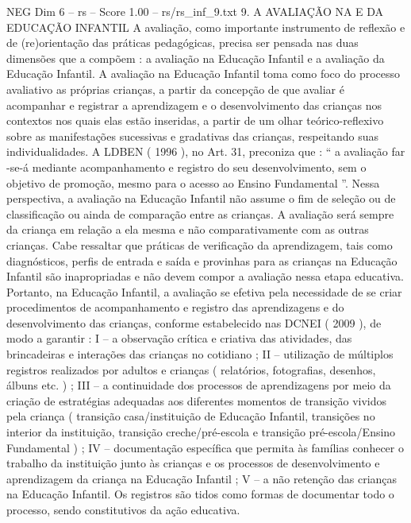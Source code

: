\begin{textsample}{NEG Dim 6 – rs – Score 1.00 – rs/rs\_inf\_9.txt}  \label{ex:f6_neg_101}
9.
A AVALIAÇÃO NA E DA EDUCAÇÃO INFANTIL A avaliação, como importante instrumento de reflexão e de (re)orientação das práticas pedagógicas, precisa ser pensada nas duas dimensões que a compõem : a avaliação na Educação Infantil e a avaliação da Educação Infantil.
A avaliação na Educação Infantil toma como foco do processo avaliativo as próprias crianças, a partir da concepção de que avaliar é acompanhar e registrar a aprendizagem e o desenvolvimento das crianças nos contextos nos quais elas estão inseridas, a partir de um olhar teórico-reflexivo sobre as manifestações sucessivas e gradativas das crianças, respeitando suas individualidades.
A LDBEN ( 1996 ), no Art. 31, preconiza que : “ a avaliação far -se-á mediante acompanhamento e registro do seu desenvolvimento, sem o objetivo de promoção, mesmo para o acesso ao Ensino Fundamental ”.
Nessa perspectiva, a avaliação na Educação Infantil não assume o fim de seleção ou de classificação ou ainda de comparação entre as crianças.
A avaliação será sempre da criança em relação a ela mesma e não comparativamente com as outras crianças.
Cabe ressaltar que práticas de verificação da aprendizagem, tais como diagnósticos, perfis de entrada e saída e provinhas para as crianças na Educação Infantil são inapropriadas e não devem compor a avaliação nessa etapa educativa.
Portanto, na Educação Infantil, a avaliação se efetiva pela necessidade de se criar procedimentos de acompanhamento e registro das aprendizagens e do desenvolvimento das crianças, conforme estabelecido nas DCNEI ( 2009 ), de modo a garantir : I – a observação crítica e criativa das atividades, das brincadeiras e interações das crianças no cotidiano ; II – utilização de múltiplos registros realizados por adultos e crianças ( relatórios, fotografias, desenhos, álbuns etc. ) ; III – a continuidade dos processos de aprendizagens por meio da criação de estratégias adequadas aos diferentes momentos de transição vividos pela criança ( transição casa/instituição de Educação Infantil, transições no interior da instituição, transição creche/pré-escola e transição pré-escola/Ensino Fundamental ) ; IV – documentação específica que permita às famílias conhecer o trabalho da instituição junto às crianças e os processos de desenvolvimento e aprendizagem da criança na Educação Infantil ; V – a não retenção das crianças na Educação Infantil.
Os registros são tidos como formas de documentar todo o processo, sendo constitutivos da ação educativa.

\end{textsample}
